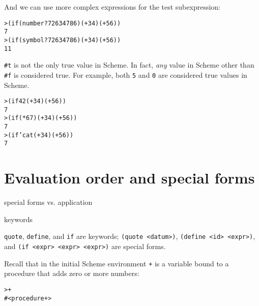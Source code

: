 \documentclass{book}
\begin{document}
\noindent
And we can use more complex expressions for the test subexpression:

\begin{alltt}
> (if (number? 72634786) (+ 3 4) (+ 5 6))
7
> (if (symbol? 72634786) (+ 3 4) (+ 5 6))
11
\end{alltt}












\verb|#t| is not the only true value in Scheme.
In fact, \emph{any} value in Scheme other than \verb|#f| is considered true.
For example, both \verb|5| and \verb|0| are considered true values in Scheme.

\begin{alltt}
> (if 42 (+ 3 4) (+ 5 6))
7
> (if (* 6 7) (+ 3 4) (+ 5 6))
7
> (if 'cat (+ 3 4) (+ 5 6))
7
\end{alltt}




\section{Evaluation order and special forms}

special forms vs. application

keywords

\verb|quote|, \verb|define|, and \verb|if| are keywords; \verb|(quote <datum>)|, \verb|(define <id> <expr>)|, and \verb|(if <expr> <expr> <expr>)| are special forms.

Recall that in the initial Scheme environment \verb|+| is a variable bound to a procedure that adds zero or more numbers:

\begin{alltt}
> +
#<procedure +>
\end{alltt}
\end{document}
